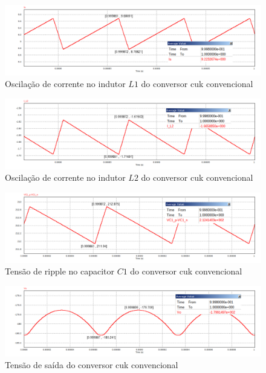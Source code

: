 \documentclass[
	12pt,				%
	openright,			%
	twoside,			%
	a4paper,			%
	english,			%
	french,				%
	spanish,			%
	brazil,				%
	]{abntex2}
\begin{document}
\begin{figure}[htb]%
	\centering
		\includegraphics[width= \linewidth]{cuk_conv_ripp_I_L1}
		\caption{Oscilação de corrente no indutor $L1$ do conversor cuk convencional}
		\label{fig:cuk_conv_ripp_I_L1}
\end{figure}

\begin{figure}[htb]%
	\centering
		\includegraphics[width= \linewidth]{cuk_conv_ripp_I_L2}
		\caption{Oscilação de corrente no indutor $L2$ do conversor cuk convencional}
		\label{fig:cuk_conv_ripp_I_L2}
\end{figure}

\begin{figure}[H]%
	\centering
		\includegraphics[width= \linewidth]{cuk_conv_ripp_V_C1}
		\caption{Tensão de ripple no capacitor $C1$ do conversor cuk convencional}
		\label{fig:cuk_conv_ripp_V_C1}
\end{figure}


\begin{figure}[H]%
	\centering
		\includegraphics[width= \linewidth]{cuk_conv_ripp_V_out2}
		\caption{Tensão de saída do conversor cuk convencional}
		\label{fig:cuk_conv_ripp_V_out_}
\end{figure}
\end{document}
